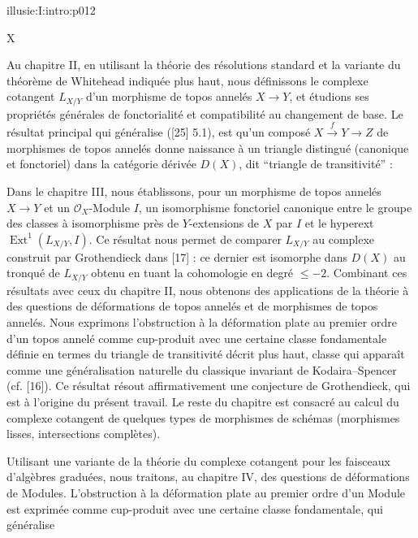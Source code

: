 \IllusieSetPhysicalPageSize{447bp}{698.6bp}
\begin{illusiefrontpage}{illusie:I:intro:p012}{}
\begin{center}\fontsize{10}{12}\selectfont X\end{center}
\vspace{12bp}
\hypertarget{illusie:I:intro:p012:p1}{}%
Au chapitre II, en utilisant la théorie des résolutions standard et la variante du
théorème de Whitehead indiquée plus haut, nous définissons le complexe cotangent
$L_{X/Y}$ d'un morphisme de topos annelés $X\longrightarrow Y$, et étudions ses
propriétés générales de fonctorialité et compatibilité au changement de base. Le
résultat principal qui généralise ([25] 5.1), est qu'un composé
$X\xrightarrow{f}Y\longrightarrow Z$ de morphismes de topos annelés donne naissance
à un triangle distingué (canonique et fonctoriel) dans la catégorie dérivée $D(X)$,
dit ``triangle de transitivité'' :

\hypertarget{illusie:I:intro:p012:d1}{}%
\IllusieTransitivityTriangle

\vspace{1bp}
\hypertarget{illusie:I:intro:p012:p2}{}%
Dans le chapitre III, nous établissons, pour un morphisme de topos annelés
$X\longrightarrow Y$ et un $\mathcal O_X$-Module $I$, un isomorphisme fonctoriel
canonique entre le groupe des classes à isomorphisme près de $Y$-extensions de $X$
par $I$ et le hyperext $\operatorname{Ext}^{1}(L_{X/Y},I)$. Ce résultat nous permet
de comparer $L_{X/Y}$ au complexe construit par Grothendieck dans [17] : ce dernier
est isomorphe dans $D(X)$ au tronqué de $L_{X/Y}$ obtenu en tuant la cohomologie en
degré $\leq -2$. Combinant ces résultats avec ceux du chapitre II, nous obtenons des
applications de la théorie à des questions de déformations de topos annelés et de
morphismes de topos annelés. Nous exprimons l'obstruction à la déformation plate au
premier ordre d'un topos annelé comme cup-produit avec une certaine classe
fondamentale définie en termes du triangle de transitivité décrit plus haut, classe
qui apparaît comme une généralisation naturelle du classique invariant de
Kodaira--Spencer (cf. [16]). Ce résultat résout affirmativement une conjecture de
Grothendieck, qui est à l'origine du présent travail. Le reste du chapitre est
consacré au calcul du complexe cotangent de quelques types de morphismes de schémas
(morphismes lisses, intersections complètes).

\vspace{4bp}
\hypertarget{illusie:I:intro:p012:p3}{}%
Utilisant une variante de la théorie du complexe cotangent pour les faisceaux
d'algèbres graduées, nous traitons, au chapitre IV, des questions de déformations de
Modules. L'obstruction à la déformation plate au premier ordre d'un Module est
exprimée comme cup-produit avec une certaine classe fondamentale, qui généralise
\end{illusiefrontpage}
